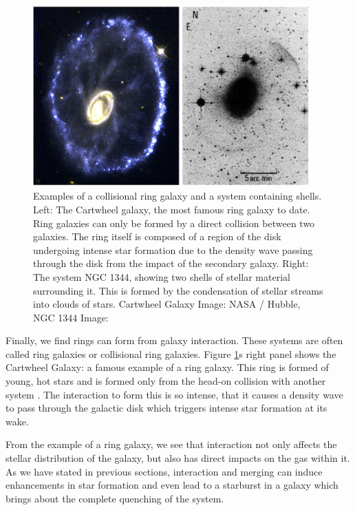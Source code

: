 \begin{figure}
\centering
\includegraphics[width=0.95\textwidth]{Introduction/figures/shells-rings.jpg}
\caption[Examples of a collisional ring galaxy and a system containing shells.]{Examples of a collisional ring galaxy and a system containing shells. Left: The Cartwheel galaxy, the most famous ring galaxy to date. Ring galaxies can only be formed by a direct collision between two galaxies. The ring itself is composed of a region of the disk undergoing intense star formation due to the density wave passing through the disk from the impact of the secondary galaxy. Right: The system NGC 1344, showing two shells of stellar material surrounding it. This is formed by the condensation of stellar streams into clouds of stars. Cartwheel Galaxy Image: NASA / Hubble, NGC 1344 Image: \citet{1983ApJ...274..534M}}
\label{fig:tidal-features-ex}
\end{figure}

Finally, we find rings can form from galaxy interaction. These systems are often called ring galaxies or collisional ring galaxies. Figure \ref{fig:tidal-features-ex}s right panel shows the Cartwheel Galaxy: a famous example of a ring galaxy. This ring is formed of young, hot stars and is formed only from the head-on collision with another system \citep{1976ApJ...209..382L}. The interaction to form this is so intense, that it causes a density wave to pass through the galactic disk which triggers intense star formation at its wake.

From the example of a ring galaxy, we see that interaction not only affects the stellar distribution of the galaxy, but also has direct impacts on the gas within it. As we have stated in previous sections, interaction and merging can induce enhancements in star formation and even lead to a starburst in a galaxy which brings about the complete quenching of the system.


